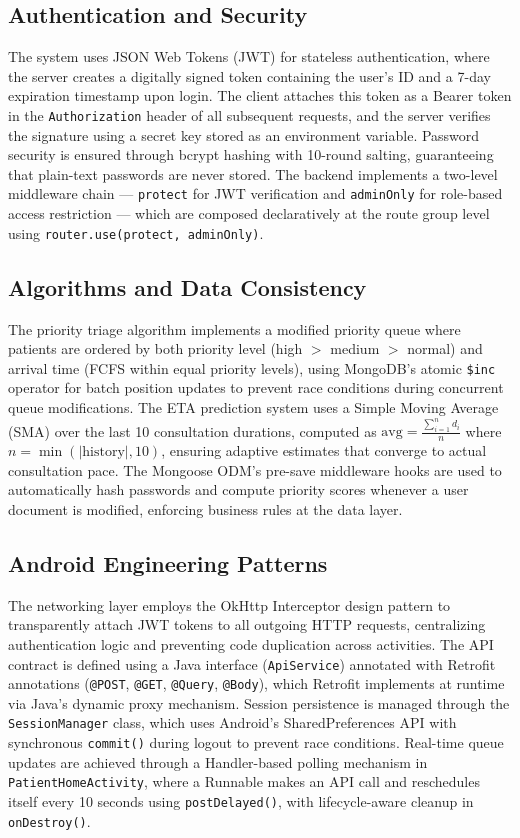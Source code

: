 \documentclass[12pt,a4paper]{article}
\begin{document}
\subsection{Authentication and Security}
The system uses JSON Web Tokens (JWT) for stateless authentication, where the server creates a digitally signed token containing the user's ID and a 7-day expiration timestamp upon login. The client attaches this token as a Bearer token in the \texttt{Authorization} header of all subsequent requests, and the server verifies the signature using a secret key stored as an environment variable. Password security is ensured through bcrypt hashing with 10-round salting, guaranteeing that plain-text passwords are never stored. The backend implements a two-level middleware chain --- \texttt{protect} for JWT verification and \texttt{adminOnly} for role-based access restriction --- which are composed declaratively at the route group level using \texttt{router.use(protect, adminOnly)}.

\subsection{Algorithms and Data Consistency}
The priority triage algorithm implements a modified priority queue where patients are ordered by both priority level (high $>$ medium $>$ normal) and arrival time (FCFS within equal priority levels), using MongoDB's atomic \texttt{\$inc} operator for batch position updates to prevent race conditions during concurrent queue modifications. The ETA prediction system uses a Simple Moving Average (SMA) over the last 10 consultation durations, computed as $\text{avg} = \frac{\sum_{i=1}^{n} d_i}{n}$ where $n = \min(|\text{history}|, 10)$, ensuring adaptive estimates that converge to actual consultation pace. The Mongoose ODM's pre-save middleware hooks are used to automatically hash passwords and compute priority scores whenever a user document is modified, enforcing business rules at the data layer.

\subsection{Android Engineering Patterns}
The networking layer employs the OkHttp Interceptor design pattern to transparently attach JWT tokens to all outgoing HTTP requests, centralizing authentication logic and preventing code duplication across activities. The API contract is defined using a Java interface (\texttt{ApiService}) annotated with Retrofit annotations (\texttt{@POST}, \texttt{@GET}, \texttt{@Query}, \texttt{@Body}), which Retrofit implements at runtime via Java's dynamic proxy mechanism. Session persistence is managed through the \texttt{SessionManager} class, which uses Android's SharedPreferences API with synchronous \texttt{commit()} during logout to prevent race conditions. Real-time queue updates are achieved through a Handler-based polling mechanism in \texttt{PatientHomeActivity}, where a Runnable makes an API call and reschedules itself every 10 seconds using \texttt{postDelayed()}, with lifecycle-aware cleanup in \texttt{onDestroy()}.
\end{document}
